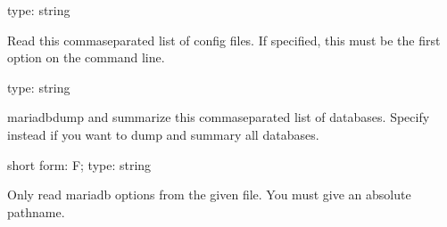 \documentclass[letterpaper,10pt,english]{sphinxmanual}
\begin{document}
\begin{fulllineitems}
\label{\detokenize{mariadb-summary:cmdoption-mariadb-summary-config}}
\sphinxAtStartPar
type: string

\sphinxAtStartPar
Read this comma\sphinxhyphen{}separated list of config files.  If specified, this must be the
first option on the command line.

\end{fulllineitems}


\begin{fulllineitems}
\label{\detokenize{mariadb-summary:cmdoption-mariadb-summary-databases}}
\sphinxAtStartPar
type: string

\sphinxAtStartPar
mariadb\sphinxhyphen{}dump and summarize this comma\sphinxhyphen{}separated list of databases.  Specify
{\hyperref[\detokenize{mariadb-summary:cmdoption-mariadb-summary-all-databases}]{}} instead if you want to dump and summary all databases.

\end{fulllineitems}


\begin{fulllineitems}
\label{\detokenize{mariadb-summary:cmdoption-mariadb-summary-defaults-file}}
\sphinxAtStartPar
short form: \sphinxhyphen{}F; type: string

\sphinxAtStartPar
Only read mariadb options from the given file.  You must give an absolute
pathname.

\end{fulllineitems}
\end{document}
